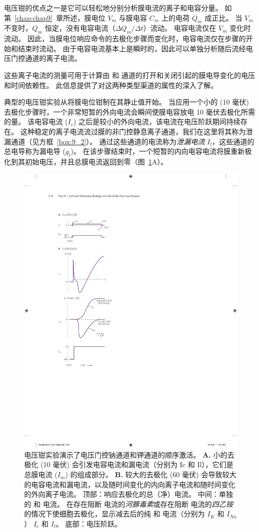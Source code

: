 电压钳的优点之一是它可以轻松地分别分析膜电流的离子和电容分量。
如第~\ref{chap:chap9}~章所述，膜电位 $V_m$ 与膜电容 $C_m$ 上的电荷 $Q_m$ 成正比。
当 $V_m$ 不变时，$Q_m$ 恒定，没有电容电流（$\Delta Q_m / \Delta t）$流动。
电容电流仅在 $V_m$ 变化时流动。
因此，当膜电位响应命令的去极化步骤而变化时，电容电流仅在步骤的开始和结束时流动。
由于电容电流基本上是瞬时的，因此可以单独分析随后流经电压门控通道的离子电流。


这些离子电流的测量可用于计算由  和  通道的打开和关闭引起的膜电导变化的电压和时间依赖性。
此信息提供了对这两种类型渠道的属性的深入了解。


典型的电压钳实验从将膜电位钳制在其静止值开始。
当应用一个小的 (10 毫伏) 去极化步骤时，一个非常短暂的外向电流会瞬间使膜电容放电 10 毫伏去极化所需的量。
该电容电流 ($I_c$) 之后是较小的外向电流，该电流在电压阶跃期间持续存在。
这种稳定的离子电流流过膜的非门控静息离子通道，我们在这里将其称为泄漏通道（见方框~\ref{box:9_2}）。
通过这些通道的电流称为\textit{泄漏电流} $I_l$，这些通道的总电导称为漏电导 ($g_l$)。
在该步骤结束时，一个短暂的内向电容电流将膜重新极化到其初始电压，并且总膜电流返回到零（图~\ref{fig:10_3}A）。


\begin{figure}[htbp]
	\centering
	\includegraphics[width=0.4\linewidth]{chap10/fig_10_3}
	\caption{电压钳实验演示了电压门控钠通道和钾通道的顺序激活。 
		\textbf{A.} 小的去极化 (10 毫伏) 会引发电容电流和漏电流（分别为 Ic 和 Il），它们是总膜电流 ($I_m$) 的组成部分。
		\textbf{B.} 较大的去极化 (60 毫伏) 会导致较大的电容电流和漏电流，以及随时间变化的内向离子电流和随时间变化的外向离子电流。
		顶部：响应去极化的总（净）电流。
		中间：单独的  和  电流。
		在存在阻断  电流的\textit{河豚毒素}或存在阻断  电流的\textit{四乙铵}的情况下使细胞去极化，显示减去后的纯  和  电流（分别为 $I_K$ 和 $I_{Na}$） $I_c$ 和 $I_l$。
		底部：电压阶跃。}
	\label{fig:10_3}
\end{figure}


